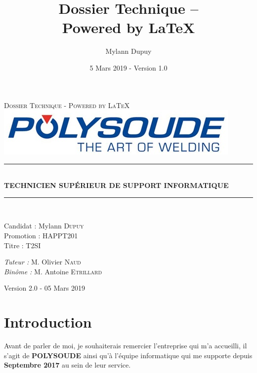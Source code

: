 \documentclass[11pt,a4paper,oneside]{article}
\author{Mylann Dupuy}
\title{Dossier Technique --  \\ Powered by \LaTeX}
\date{5 Mars 2019 - Version 1.0}
\newcommand{\HRule}{\rule{\linewidth}{0.5mm}}
\begin{document}
\begin{titlepage}
  \begin{sffamily}
  \begin{center}

    \textsc{\LARGE Dossier Technique - Powered by \LaTeX}\\[6.5cm]
    \includegraphics[scale=1]{Ressources/polysoude.jpg}
        \HRule \\[0.4cm]
        { \huge \bfseries TECHNICIEN SUPÉRIEUR DE SUPPORT INFORMATIQUE\\[0.4cm] }

        \HRule \\[6.5cm]

    \begin{minipage}{0.4\textwidth}
      \begin{flushleft} \large
        Candidat : Mylann \textsc{Dupuy}\\
        Promotion : HAPPT201\\
        Titre : T2SI
      \end{flushleft}
    \end{minipage}
    \begin{minipage}{0.5\textwidth}
      \begin{flushright} \large
        \emph{Tuteur :} M. Olivier \textsc{Naud}\\
        \emph{Binôme :} M. Antoine \textsc{Etrillard}\\
      \end{flushright}
    \end{minipage}

    \vfill

    {\large Version 2.0 - 05 Mars 2019}

  \end{center}
  \end{sffamily}
\end{titlepage}
\newpage
\tableofcontents
\newpage
\setcounter{page}{3}
\newpage

\section{Introduction}
Avant de parler de moi, je souhaiterais remercier l'entreprise qui m'a accueilli, il s'agit de \textbf{POLYSOUDE} ainsi qu'à l'équipe informatique qui me supporte depuis \textbf{Septembre 2017} au sein de leur service.
\end{document}
